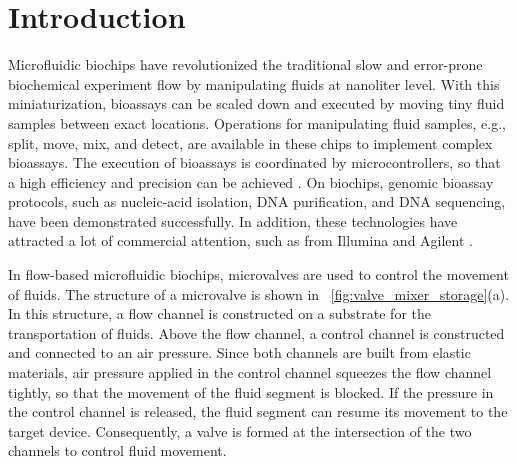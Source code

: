 \section{Introduction}

Microfluidic biochips have revolutionized the traditional slow and error-prone
biochemical experiment flow by manipulating fluids at nanoliter level. With
this miniaturization, bioassays can be scaled down and executed by moving tiny
fluid samples between exact locations. Operations for manipulating fluid
samples, e.g., split,  move, mix, and detect, are available in these chips to
implement complex bioassays. The execution of bioassays  is coordinated by
microcontrollers, so that  a high efficiency and precision can be achieved
\cite{JMSQ07,JEMP08,KrCh10}.   On biochips, genomic bioassay protocols, such as
nucleic-acid isolation, DNA purification, and DNA sequencing, have been
demonstrated successfully. In addition,  these technologies have attracted a
lot of commercial attention, such as from Illumina \cite{illumina} and Agilent
\cite{agilent}.


In flow-based microfluidic biochips, 
microvalves are used to control the movement of fluids.  
The structure of a microvalve
is shown in \figname~\ref{fig:valve_mixer_storage}(a).  In this structure, a
flow channel is constructed on a substrate for the transportation of fluids.
Above the flow channel, a control channel is constructed and
connected to an air pressure. Since both channels are built from
elastic materials, air pressure applied in the control channel squeezes the
flow channel tightly, so that the movement of the fluid segment is blocked.
If the pressure in the control channel is released, the fluid
segment can resume its movement to the target device. Consequently, a valve is
formed at the intersection of the two channels to control fluid movement.

